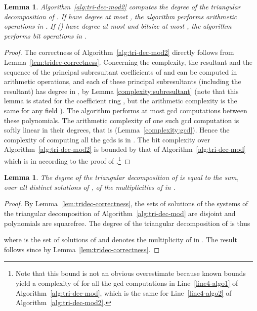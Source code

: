 \documentclass{sig-alternate}
\newtheorem{lemma}[theorem]{Lemma}
\begin{document}
\begin{lemma}\label{lem:tridec_pair}
Algorithm~\ref{alg:tri-dec-mod2} computes the degree of the triangular decomposition of .
If  have degree at most , the algorithm performs  arithmetic
operations in . If 
 () have degree at most  and bitsize at most ,
the algorithm performs  bit 
operations in . 
\end{lemma}

\begin{proof}
The correctness of Algorithm~\ref{alg:tri-dec-mod2} directly follows from
Lemma~\ref{lem:tridec-correctness}. Concerning the complexity, the resultant and the sequence of the principal subresultant coefficients of  and  can be computed in
   arithmetic operations, and each of these principal subresultants (including the
  resultant) has degree in , by  Lemma \ref{complexity:subresultant} (note that this lemma is stated for
  the coefficient ring , but the arithmetic complexity is the same for any
  field ).
  The algorithm performs at most  gcd computations between these polynomials. 
  The arithmetic complexity of one such gcd computation is softly
  linear in their degrees, that is 
  (Lemma~\ref{complexity:gcd}). Hence the complexity of computing 
  all the gcds is in . 
The bit complexity over  Algorithm~\ref{alg:tri-dec-mod2} is bounded by that of
  Algorithm~\ref{alg:tri-dec-mod} which is in  according to the proof of
  \cite[Thm. 19]{det-jsc-2009}.\footnote{\small Note that this bound is not an obvious overestimate because  known bounds yield a complexity of  for all the gcd computations
  in Line~\ref{line4-algo1} of Algorithm~\ref{alg:tri-dec-mod}, which is the
  same for Line~\ref{line4-algo2} of Algorithm~\ref{alg:tri-dec-mod2}.}
\end{proof}




\begin{lemma}\label{lem:mult} 
The degree of the triangular decomposition of  is equal to the sum, over all distinct
solutions  of ,  of the multiplicities of  in . 
\end{lemma}
\begin{proof}
By Lemma~\ref{lem:tridec-correctness}, the sets of solutions of the systems of the triangular decomposition of
Algorithm~\ref{alg:tri-dec-mod} are disjoint and polynomials  are squarefree. The degree of the
triangular decomposition of  is thus 

where  is the set of solutions of  and  denotes the multiplicity of  in .
The result follows since   by Lemma~\ref{lem:tridec-correctness}.
\end{proof}
\end{document}
